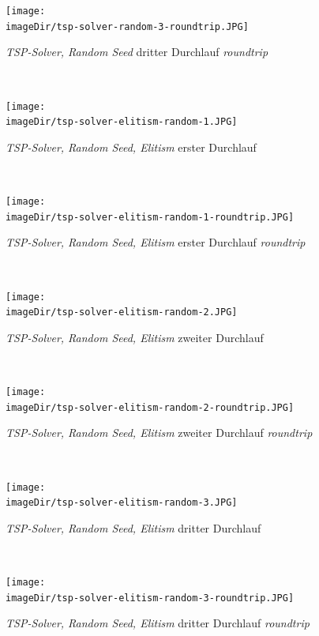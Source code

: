 \documentclass[11pt, a4paper, twoside]{article}   	%
\newcommand{\imageDir}{images}
\begin{document}
\begin{figure}[h]
	\centering
	\texttt{[image: \\imageDir/tsp-solver-random-3-roundtrip.JPG]}
	\caption{\emph{TSP-Solver, Random Seed} dritter Durchlauf \emph{roundtrip}}
\end{figure}
\ \newpage

\begin{figure}[h]
	\centering
	\texttt{[image: \\imageDir/tsp-solver-elitism-random-1.JPG]}
	\caption{\emph{TSP-Solver, Random Seed, Elitism} erster Durchlauf}
\end{figure}
\ \newpage

\begin{figure}[h]
	\centering
	\texttt{[image: \\imageDir/tsp-solver-elitism-random-1-roundtrip.JPG]}
	\caption{\emph{TSP-Solver, Random Seed, Elitism} erster Durchlauf \emph{roundtrip}}
\end{figure}
\ \newpage

\begin{figure}[h]
	\centering
	\texttt{[image: \\imageDir/tsp-solver-elitism-random-2.JPG]}
	\caption{\emph{TSP-Solver, Random Seed, Elitism} zweiter Durchlauf}
\end{figure}
\ \newpage

\begin{figure}[h]
	\centering
	\texttt{[image: \\imageDir/tsp-solver-elitism-random-2-roundtrip.JPG]}
	\caption{\emph{TSP-Solver, Random Seed, Elitism} zweiter Durchlauf \emph{roundtrip}}
\end{figure}
\ \newpage

\begin{figure}[h]
	\centering
	\texttt{[image: \\imageDir/tsp-solver-elitism-random-3.JPG]}
	\caption{\emph{TSP-Solver, Random Seed, Elitism} dritter Durchlauf}
\end{figure}
\ \newpage

\begin{figure}[h]
	\centering
	\texttt{[image: \\imageDir/tsp-solver-elitism-random-3-roundtrip.JPG]}
	\caption{\emph{TSP-Solver, Random Seed, Elitism} dritter Durchlauf \emph{roundtrip}}
\end{figure}
\ \newpage
\end{document}
